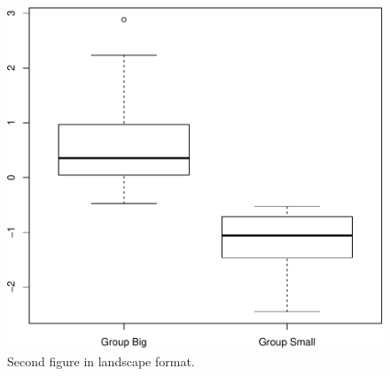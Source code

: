 \documentclass[11pt,a4paper]{article}
\newcommand{\blandscape}{\begin{landscape}}
\newcommand{\elandscape}{\end{landscape}}
\begin{document}
\newpage

\blandscape

\begin{figure}
\centering
\includegraphics{output/figures/Fig2-1.pdf}
\caption{Second figure in landscape format.}
\end{figure}

\elandscape

\clearpage
\end{document}
